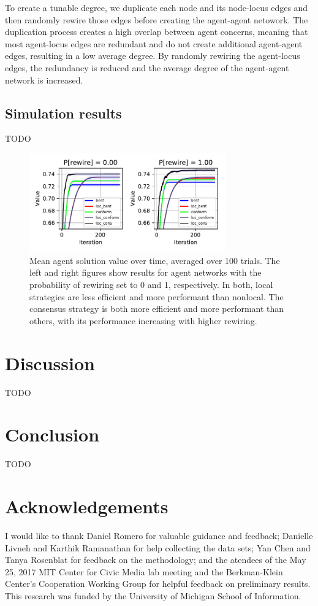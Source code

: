 \documentclass[10pt,twocolumn]{article}
\newcommand{\+}{\phantom{-}}
\begin{document}
To create a tunable degree, we duplicate each node and its node-locus edges and then
randomly rewire those edges before creating the agent-agent netowork.
The duplication process creates a high overlap between agent concerns,
meaning that most agent-locus edges are redundant and do not create additional agent-agent edges,
resulting in a low average degree.
By randomly rewiring the agent-locus edges, the redundancy is reduced and the average degree of
the agent-agent network is increased.

\subsection{Simulation results}

TODO

\begin{figure}
\includegraphics[width=3.33in,height=1.67in]{fig-val-iter.pdf}
\caption{
Mean agent solution value over time, averaged over 100 trials.
The left and right figures show results for agent networks with the probability of
rewiring set to 0 and 1, respectively.
In both, local strategies are less efficient and more performant than nonlocal.
The consensus strategy is both more efficient and more performant than others,
with its performance increasing with higher rewiring.
\label{fig:val-iter}
}
\end{figure}

\section{Discussion}
TODO

\section{Conclusion}
TODO

\section{Acknowledgements}
I would like to thank Daniel Romero for valuable guidance and feedback;
Danielle Livneh and Karthik Ramanathan for help collecting the data sets;
Yan Chen and Tanya Rosenblat for feedback on the methodology;
and the atendees of the May 25, 2017 MIT Center for Civic Media lab meeting and
the Berkman-Klein Center's Cooperation Working Group for helpful feedback on
preliminary results.
This research was funded by the University of Michigan School of Information.

%



 
\end{document}
